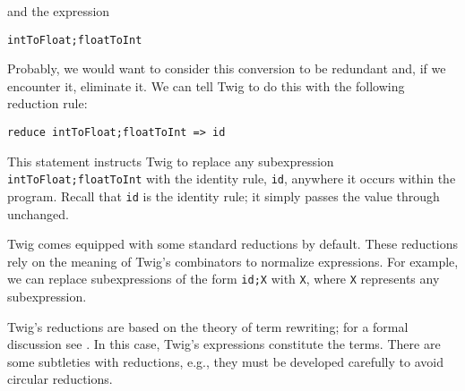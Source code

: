 \noindent and the expression

\begin{verbatim}
intToFloat;floatToInt
\end{verbatim}

Probably, we would want to consider this conversion to be redundant and, if we encounter it, eliminate it. We can tell Twig to do this with the following reduction rule:

\begin{verbatim}
reduce intToFloat;floatToInt => id
\end{verbatim}

This statement instructs Twig to replace any subexpression \texttt{intToFloat;floatToInt} with the identity rule, \texttt{id}, anywhere it occurs within the program. Recall that \texttt{id} is the identity rule; it simply passes the value through unchanged.

Twig comes equipped with some standard reductions by default. These reductions rely on the meaning of Twig's combinators to normalize expressions. For example, we can replace subexpressions of the form \texttt{id;X} with \texttt{X}, where \texttt{X} represents any subexpression.

% 
% 

Twig's reductions are based on the theory of term rewriting; for a formal discussion see \cite{baader98rewriting}. In this case, Twig's expressions constitute the terms. There are some subtleties with reductions, e.g., they must be developed carefully to avoid circular reductions.
